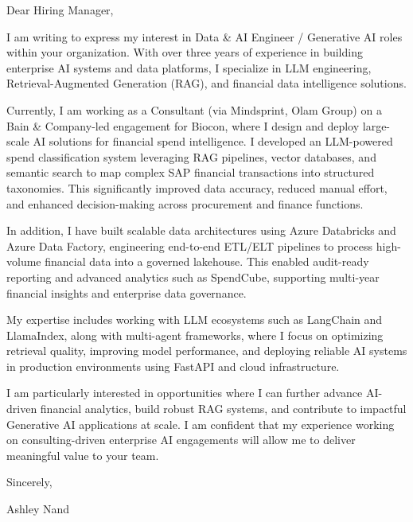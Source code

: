 \documentclass[11pt,a4paper]{letter}
\begin{document}
\begin{letter}

\opening{Dear Hiring Manager,}

\vspace{2mm}

I am writing to express my interest in Data \& AI Engineer / Generative AI roles within your organization. With over three years of experience in building enterprise AI systems and data platforms, I specialize in LLM engineering, Retrieval-Augmented Generation (RAG), and financial data intelligence solutions.

Currently, I am working as a Consultant (via Mindsprint, Olam Group) on a Bain \& Company-led engagement for Biocon, where I design and deploy large-scale AI solutions for financial spend intelligence. I developed an LLM-powered spend classification system leveraging RAG pipelines, vector databases, and semantic search to map complex SAP financial transactions into structured taxonomies. This significantly improved data accuracy, reduced manual effort, and enhanced decision-making across procurement and finance functions.

In addition, I have built scalable data architectures using Azure Databricks and Azure Data Factory, engineering end-to-end ETL/ELT pipelines to process high-volume financial data into a governed lakehouse. This enabled audit-ready reporting and advanced analytics such as SpendCube, supporting multi-year financial insights and enterprise data governance.

My expertise includes working with LLM ecosystems such as LangChain and LlamaIndex, along with multi-agent frameworks, where I focus on optimizing retrieval quality, improving model performance, and deploying reliable AI systems in production environments using FastAPI and cloud infrastructure.

I am particularly interested in opportunities where I can further advance AI-driven financial analytics, build robust RAG systems, and contribute to impactful Generative AI applications at scale. I am confident that my experience working on consulting-driven enterprise AI engagements will allow me to deliver meaningful value to your team.

\vspace{2mm}
\closing{Sincerely,}

Ashley Nand

\end{letter}
\end{document}
